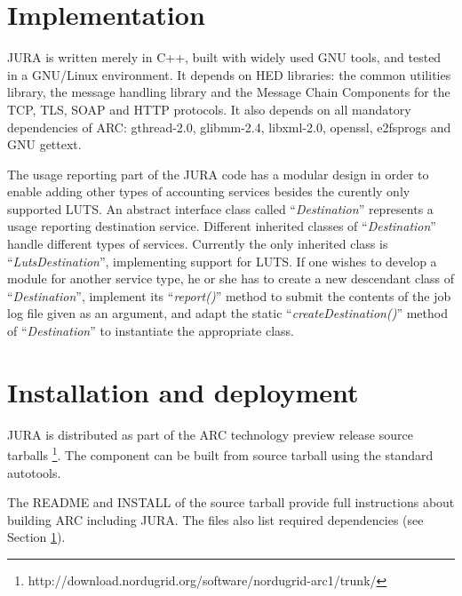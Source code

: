 \documentclass{article}                            %
\begin{document}




\section{Implementation}
\label{implement}
JURA is written merely in C++, built with widely used GNU tools, and
tested in a GNU/Linux environment. It depends on HED libraries: the
common utilities library, the message handling library and the Message
Chain Components for the TCP, TLS, SOAP and HTTP protocols. It also
depends on all mandatory dependencies of ARC: gthread-2.0, glibmm-2.4,
libxml-2.0, openssl, e2fsprogs and GNU gettext.


The usage reporting part of the JURA code has a modular design in
order to enable adding other types of accounting services besides the
curently only supported LUTS. An abstract interface class called
``\textit{Destination}'' represents a usage reporting destination
service. Different inherited classes of ``\textit{Destination}''
handle different types of services. Currently the only inherited class
is ``\textit{LutsDestination}'', implementing support for LUTS. If one
wishes to develop a module for another service type, he or she has to
create a new descendant class of ``\textit{Destination}'', implement
its ``\textit{report()}'' method to submit the contents of the job log
file given as an argument, and adapt the static
``\textit{createDestination()}'' method of ``\textit{Destination}'' to
instantiate the appropriate class.

\section{Installation and deployment}

JURA is distributed as part of the ARC technology preview release
source tarballs \footnote{http://download.nordugrid.org/software/nordugrid-arc1/trunk/}.
The component can be built from source tarball using the standard autotools.

The README and INSTALL of the source tarball provide full
instructions about building ARC including JURA. The files also list
required dependencies (see Section \ref{implement}).
\end{document}
